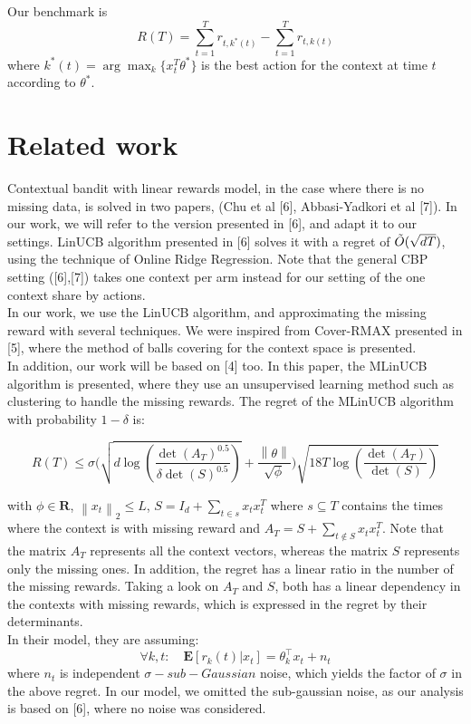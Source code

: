 \documentclass{article}
\newcommand{\norm}[1]{\left\lVert#1\right\rVert}
\begin{document}
Our benchmark is 
\[R(T) = \sum_{t=1}^T r_{t,k^*(t)} - \sum_{t=1}^T r_{t,k(t)}\]
where $k^*(t) = \arg\max_{k} \{x^T_t \theta^*\}$ is the best action for the context at time $t$ according to $\theta^*$.\\


\section{Related work}

Contextual bandit with linear rewards model, in the case where there is no missing data, is solved in two papers, (Chu et al [6], Abbasi-Yadkori et al [7]). In our work, we will refer to the version presented in [6], and adapt it to our settings. LinUCB algorithm presented in [6] solves it with a regret of $\Tilde{O}(\sqrt{dT})$, using the technique of Online Ridge Regression. Note that the general CBP setting ([6],[7]) takes one context per arm instead for our setting of the one context share by actions.\\

In our work, we use the LinUCB algorithm, and approximating the missing reward with several techniques. We were inspired from Cover-RMAX presented in [5], where the method of balls covering for the context space is presented.\\

In addition, our work will be based on [4] too. In this paper, the MLinUCB algorithm is presented, where they use an unsupervised learning method such as clustering to handle the missing rewards. The regret of the MLinUCB algorithm with probability $1-\delta$ is:

$$ R(T) \leq \sigma \Bigg( \sqrt{d \log(\frac{\det(A_T)^{0.5}}{\delta \det(S)^{0.5}})} + \frac{\norm{\theta}}{\sqrt{\phi}} \Bigg) \sqrt{18 T \log(\frac{\det(A_T)}{\det(S)})}$$

with $\phi \in \mathbf{R}$, $\norm{x_t}_2 \leq L$, $S = I_d + \sum _{t \in s} x_tx_t^T$ where $s \subseteq T$ contains the times where the context is with missing reward and 
$A_T = S + \sum _{t \notin S} x_t x_t^T$. Note that the matrix $A_T$ represents all the context vectors, whereas the matrix $S$ represents only the missing ones. In addition, the regret has a linear ratio in the number of the missing rewards. Taking a look on $A_T$ and $S$, both has a linear dependency in the contexts with missing rewards, which is expressed in the regret by their determinants.\\
In their model, they are assuming:
\[\forall k,t:\quad \mathbf{E}[r_k(t)|x_t]= \theta^\top_kx_t +n_t\]
where $n_t$ is independent $\sigma-sub-Gaussian$ noise, which yields the factor of $\sigma$ in the above regret. In our model, we omitted the sub-gaussian noise, as our analysis is based on [6], where no noise was considered.
\end{document}
